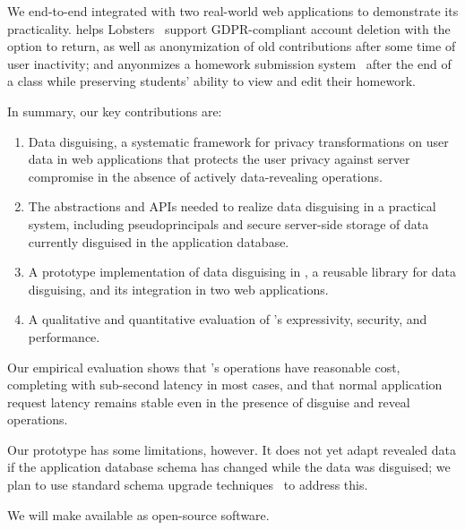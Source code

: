 %
%
We end-to-end integrated \sys with two real-world web applications to demonstrate
its practicality.
%
\sys helps Lobsters~\cite{lobsters} support GDPR-compliant account deletion with
the option to return, as well as anonymization of old contributions after some
time of user inactivity; and \sys anyonmizes a homework submission
system~\cite{websubmit-rs-anon} after the end of a class while preserving
students' ability to view and edit their homework.
%

%
%
In summary, our key contributions are:
%
\begin{enumerate}[nosep]
 \item Data disguising, a systematic framework for privacy transformations on
   user data in web applications that protects the user privacy against server
   compromise in the absence of actively data-revealing operations.
 \item The abstractions and APIs needed to realize data disguising in a
  practical system, including pseudoprincipals and secure server-side storage
  of data currently disguised in the application database.
 \item A prototype implementation of data disguising in \sys, a reusable
  library for data disguising, and its integration in two web applications.
 \item A qualitative and quantitative evaluation of \sys's expressivity,
  security, and performance.
\end{enumerate}
%
Our empirical evaluation shows that \sys's operations have reasonable cost,
completing with sub-second latency in most cases, and that normal application
request latency remains stable even in the presence of disguise and reveal
operations.
%

%
%
Our prototype has some limitations, however.
%
%
It does not yet adapt revealed data if the application database schema has
changed while the data was disguised; we plan to use standard schema upgrade
techniques~\cite{xxx-from-noria} to address this.
%

%
We will make \sys available as open-source software.
%


